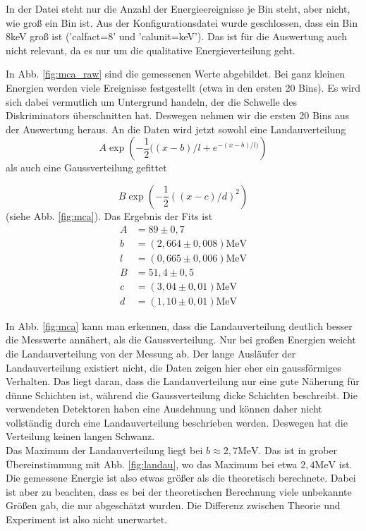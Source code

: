 In der Datei steht nur die Anzahl der Energieereignisse je Bin steht, aber nicht, wie groß ein Bin ist. Aus der Konfigurationsdatei wurde geschlossen, dass ein Bin 8keV groß ist ('calfact=8' und 'calunit=keV'). Das ist für die Auswertung auch nicht relevant, da es nur um die qualitative Energieverteilung geht.  

In Abb. \ref{fig:mca_raw} sind die gemessenen Werte abgebildet. Bei ganz kleinen Energien werden viele Ereignisse festgestellt (etwa in den ersten 20 Bins). Es wird sich dabei vermutlich um Untergrund handeln, der die Schwelle des Diskriminators überschnitten hat. Deswegen nehmen wir die ersten 20 Bins aus der Auswertung heraus. An die Daten wird jetzt sowohl eine Landauverteilung
\[A\exp{\left(-\frac{1}{2}((x-b)/l + e^{-(x-b)/l)}\right)}\] als auch eine Gaussverteilung gefittet

\[B\exp{\left(-\frac{1}{2}((x-c)/d)^2 \right)}\]
 (siehe Abb. \ref{fig:mca}). Das Ergebnis der Fits ist
 \begin{align}
 A &= 89 \pm 0,7\\
 b &= (2,664 \pm 0,008)\si{\mega\eV}\\
 l &= (0,665  \pm 0,006)\si{\mega\eV}\\
 B &= 51,4 \pm 0,5\\
 c &= (3,04\pm 0,01)\si{\mega\eV}\\
 d &=( 1,10 \pm 0,01) \si{\mega\eV}
 \end{align}
 
In Abb. \ref{fig:mca} kann man erkennen, dass die Landauverteilung deutlich besser die Messwerte annähert, als die Gaussverteilung. Nur bei großen Energien weicht die Landauverteilung von der Messung ab. Der lange Ausläufer der Landauverteilung existiert nicht, die Daten zeigen hier eher ein gaussförmiges Verhalten. Das liegt daran, dass die Landauverteilung nur eine gute Näherung für dünne Schichten ist, während die Gaussverteilung dicke Schichten beschreibt. Die verwendeten Detektoren haben eine Ausdehnung und können daher nicht vollständig durch eine Landauverteilung beschrieben werden. Deswegen hat die Verteilung keinen langen Schwanz.\\

Das Maximum der Landauverteilung liegt bei $b \approx 2,7\si{\mega\eV}$. Das ist in grober Übereinstimmung mit Abb. \ref{fig:landau}, wo das Maximum bei etwa $2,4\si{\mega\eV}$ ist. Die gemessene Energie ist also etwas größer als die theoretisch berechnete. Dabei ist aber zu beachten, dass es bei der theoretischen Berechnung viele unbekannte Größen gab, die nur abgeschätzt wurden. Die Differenz zwischen Theorie und Experiment ist also nicht unerwartet.
